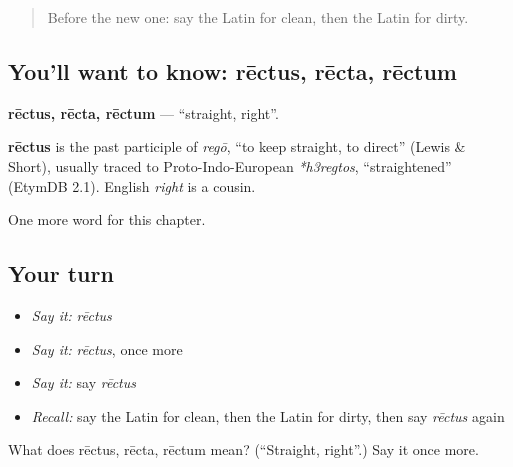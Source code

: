 \begin{quote}
Before the new one: say the Latin for clean, then the Latin for dirty.
\end{quote}

\subsection*{You'll want to know: rēctus, rēcta, rēctum}
\textbf{rēctus, rēcta, rēctum} — \textquotedblleft{}straight, right\textquotedblright{}.

\begin{cousinweb}
\textbf{rēctus} is the past participle of \emph{regō}, \textquotedblleft{}to keep straight, to direct\textquotedblright{} (Lewis \& Short), usually traced to Proto-Indo-European \emph{*h3regtos}, \textquotedblleft{}straightened\textquotedblright{} (EtymDB 2.1). English \emph{right} is a cousin.
\end{cousinweb}

\begin{grammarlens}[title={What you've built}]
One more word for this chapter.
\end{grammarlens}

\subsection*{Your turn}
\begin{itemize}
\raggedright
  \item \emph{Say it:} \emph{rēctus}
  \item \emph{Say it:} \emph{rēctus}, once more
  \item \emph{Say it:} say \emph{rēctus}
  \item \emph{Recall:} say the Latin for clean, then the Latin for dirty, then say \emph{rēctus} again
\end{itemize}

\begin{tcolorbox}[breakable,colback=teal!4,colframe=teal!35!black,title={Before you move on}]
What does rēctus, rēcta, rēctum mean? (\textquotedblleft{}Straight, right\textquotedblright{}.) Say it once more.
\end{tcolorbox}
